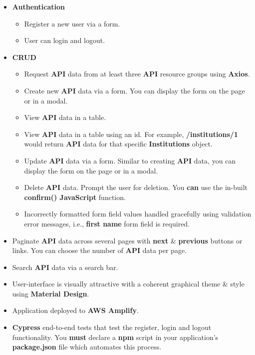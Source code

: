 \documentclass{article}
\begin{document}
\begin{itemize}
        \item \textbf{Authentication}
        \begin{itemize}
            \item Register a new user via a form.
            \item User can login and logout. 
        \end{itemize}
        \item \textbf{CRUD}
        \begin{itemize}
            \item Request \textbf{API} data from at least three \textbf{API} resource groups using \textbf{Axios}.
            \item Create new \textbf{API} data via a form. You can display the form on the page or in a modal. 
            \item View \textbf{API} data in a table.
            \item View \textbf{API} data in a table using an id. For example, \textbf{/institutions/1} would return \textbf{API} data for that specific \textbf{Institutions} object.
            \item Update \textbf{API} data via a form. Similar to creating \textbf{API} data, you can display the form on the page or in a modal. 
            \item Delete \textbf{API} data. Prompt the user for deletion. You \textbf{can} use the in-built \textbf{confirm() JavaScript} function. 
            \item Incorrectly formatted form field values handled gracefully using validation error messages, i.e., \textbf{first name} form field is required.
        \end{itemize}
        \item Paginate \textbf{API} data across several pages with \textbf{next} \& \textbf{previous} buttons or links. You can choose the number of \textbf{API} data per page.
        \item Search \textbf{API} data via a search bar.
        \item User-interface is visually attractive with a coherent graphical theme \& style using \textbf{Material Design}.
        \item Application deployed to \textbf{AWS Amplify}. 
        \item \textbf{Cypress} end-to-end tests that test the register, login and logout functionality. You \textbf{must} declare a \textbf{npm} script in your application's \textbf{package.json} file which automates this process.
\end{itemize}
\end{document}
